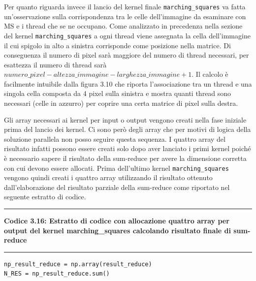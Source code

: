 \documentclass[12pt,a4paper]{report}
\begin{document}
{\newpage
Per quanto riguarda invece il lancio del kernel finale \verb|marching_squares| va fatta un'osservazione sulla corrispondenza tra le celle dell'immagine da esaminare con MS e i thread che se ne occupano. Come analizzato in precedenza nella sezione del kernel \verb|marching_squares| a ogni thread viene assegnata la cella dell'immagine il cui spigolo in alto a sinistra corrisponde come posizione nella matrice. Di conseguenza il numero di pixel sarà maggiore del numero di thread necessari, per esattezza il numero di thread sarà $numero\_pixel - altezza\_immagine - larghezza\_immagine + 1$. Il calcolo è facilmente intuibile dalla figura 3.10 che riporta l'associazione tra un thread e una singola cella composta da 4 pixel sulla sinistra e mostra quanti thread sono necessari (celle in azzurro) per coprire una certa matrice di pixel sulla destra.

\begin{figure}[H]
\centering
\begin{floatrow}[1]
\end{floatrow}
\end{figure} 
\newpage
Gli array necessari ai kernel per input o output vengono creati nella fase iniziale prima del lancio dei kernel. Ci sono però degli array che per motivi di logica della soluzione parallela non posso seguire questa sequenza. I quattro array del risultato infatti possono essere creati solo dopo aver lanciato i primi kernel poiché è necessario sapere il risultato della sum-reduce per avere la dimensione corretta con cui devono essere allocati.
Prima dell'ultimo kernel \verb|marching_squares| vengono quindi creati i quattro array utilizzando il risultato ottenuto dall'elaborazione del risultato parziale della sum-reduce come riportato nel seguente estratto di codice. \\
\noindent\rule[0.5ex]{\linewidth}{2pt}
\small{\textbf{Codice 3.16: Estratto di codice con allocazione quattro array per output del kernel marching\_squares calcolando risultato finale di sum-reduce}} \\
\noindent\rule[0.5ex]{\linewidth}{1pt}
\begin{lstlisting}
np_result_reduce = np.array(result_reduce) 
N_RES = np_result_reduce.sum() 


\end{lstlisting}}
\end{document}
